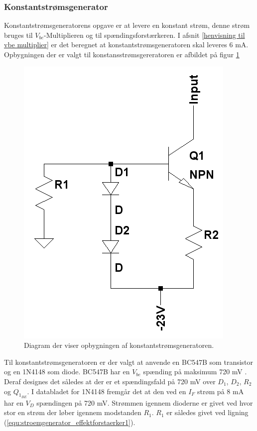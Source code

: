 \subsubsection*{Konstantstrømsgenerator}
Konstantstrømsgeneratorens opgave er at levere en konstant strøm, denne strøm bruges til $V_{be}$-Multiplieren og til spændingsforstærkeren. I afsnit \ref{henvisning til vbe multiplier} er det beregnet at konstantstrømsgeneratoren skal leveres 6 mA. Opbygningen der er valgt til konstansstrømsgereratoren er afbildet på figur \ref{konstantstroemsgenerator_model}

\begin{figure}[h]
\centering
\includegraphics[scale=0.35]{teknisk/effektforstaerker/stoemgenerator.png}
\caption{Diagram der viser opbygningen af konstantstrømsgeneratoren.}
\label{konstantstroemsgenerator_model}
\end{figure}

Til konstantstrømsgeneratoren er der valgt at anvende en BC547B som transistor og en 1N4148 som diode. BC547B har en $V_{be}$ spænding på maksimum 720 mV \cite{bc547b-datablad}. Deraf designes det således at der er et spændingsfald på 720 mV over $D_1$, $D_2$, $R_{2}$ og $Q_{1_{BE}}$. I databladet for 1N4148 \cite{1n4148-datablad} fremgår det at den  ved en $I_F$ strøm på 8 mA har en $V_D$ spændingen på 720 mV. Strømmen igennem dioderne er givet ved hvor stor en strøm der løber igennem modstanden $R_{1}$. $R_{1}$ er således givet ved ligning (\ref{equ:stroemgenerator_effektforstaerker1}).

